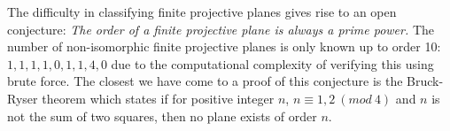 \documentclass[12pt]{article}
\begin{document}
    The difficulty in classifying finite projective planes gives rise to an open conjecture:
    \textit{The order of a finite projective plane is always a prime power.}
    The number of non-isomorphic finite projective planes is only known up to order 10: $1, 1, 1, 1, 0, 1, 1, 4, 0$
    due to the computational complexity of verifying this using brute force\cite{lam_computer_1991,lam_non-existence_1989}.
    The closest we have come to a proof of this conjecture is the Bruck-Ryser theorem\cite[p.~26]{beutelspacher_projective_1998} which states if for positive integer $n$,
    $n \equiv 1,2\ (mod\ 4)$ and $n$ is not the sum of two squares, then no plane exists of order $n$.

    \newpage
    
    
\end{document}
